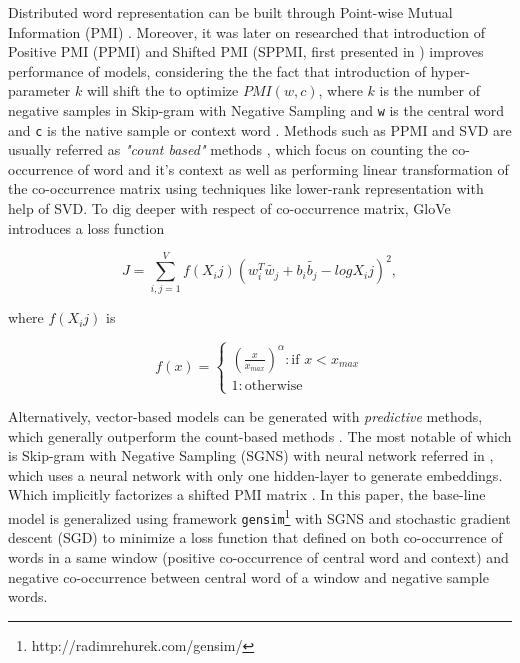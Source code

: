 Distributed word representation can be built through Point-wise Mutual Information (PMI) \cite{church1990word}. Moreover, it was later on researched that introduction of Positive PMI (PPMI) \cite{bullinaria2007extracting} and Shifted PMI (SPPMI, first presented in \cite{goldberg2014word2vec}) improves performance of models, considering the the fact that introduction of hyper-parameter $k$ will shift the to optimize $PMI(w, c)$, where $k$ is the number of negative samples in Skip-gram with Negative Sampling and \verb|w| is the central word and \verb|c| is the native sample or context word \cite{levy2014neural}. Methods such as PPMI and SVD are usually referred as \emph{"count based"} methods \cite{levy2015improving}, which focus on counting the co-occurrence of word and it's context as well as performing linear transformation of the co-occurrence matrix using techniques like lower-rank representation with help of SVD. To dig deeper with respect of co-occurrence matrix, GloVe \cite{Pennington2014glove} introduces a loss function

\begin{equation}
J=\sum_{i,j=1}^{V}f(X_ij)(w_i^T\tilde{w_j}+b_i\tilde{b_j}-logX_ij)^2,
\end{equation}

where $f(X_ij)$ is

\[f(x)=\begin{cases}
    (\frac{x}{x_{max}})^\alpha : \text{if }x<x_{max}\\
    1 : \text{otherwise}
    \end{cases}
\]

Alternatively, vector-based models can be generated with \emph{predictive} methods, which generally outperform the count-based methods \cite{levy2015improving}. The most notable of which is Skip-gram with Negative Sampling (SGNS) with neural network referred in \cite{mikolov2013distributed}, which uses a neural network with only one hidden-layer to generate embeddings. Which implicitly factorizes a shifted PMI matrix \cite{levy2014neural}. In this paper, the base-line model is generalized using framework \verb|gensim|\footnote{http://radimrehurek.com/gensim/} with SGNS and stochastic gradient descent (SGD) to minimize a loss function that defined on both co-occurrence of words in a same window (positive co-occurrence of central word and context) and negative co-occurrence between central word of a window and negative sample words. 
